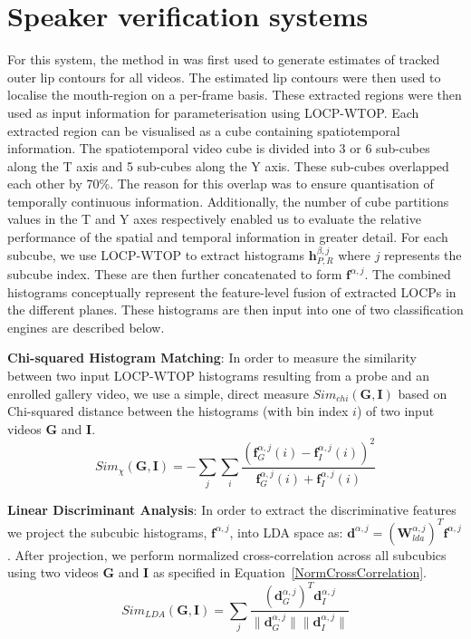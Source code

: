 \documentclass[a4paper, 10pt, conference]{ieeeconf}      %
\begin{document}
\section{Speaker verification systems}
\label{SpeakerVerificationSystems}
For this system, the method in \cite{Ramos00Thesis} was first used to generate estimates of tracked outer lip contours for all videos. 
The estimated lip contours were then used to localise the mouth-region on a per-frame basis. 
These extracted regions were then used as input information for parameterisation using LOCP-WTOP. 
Each extracted region can be visualised as a cube containing spatiotemporal information. 
The spatiotemporal video cube is divided into 3 or 6 sub-cubes along the T axis and 5 sub-cubes along the Y axis. 
These sub-cubes overlapped each other by 70\%. 
The reason for this overlap was to ensure quantisation of temporally continuous information. 
Additionally, the number of cube partitions values in the T and Y axes respectively enabled us to evaluate the relative performance of the spatial and temporal information in greater detail.  
For each subcube, we use LOCP-WTOP to extract histograms $\bm{h}_{P,R}^{\beta,j}$ where $j$ represents the subcube index. 
These are then further concatenated to form $\bm{f}^{\alpha,j}$. 
The combined histograms conceptually represent the feature-level fusion of extracted LOCPs in the different planes. 
These histograms are then input into one of two classification engines are described below. 

\textbf{Chi-squared Histogram Matching}: In order to measure the similarity between two input LOCP-WTOP histograms resulting from a probe and an enrolled gallery video, we use a simple, direct measure $Sim_{chi}(\bm{G},\bm{I})$ based on Chi-squared distance between the histograms (with bin index $i$) of two input videos $\bm{G}$ and $\bm{I}$. 
\begin{equation}
\label{MLBP:Chi_sq}
Sim_{\chi}(\bm{G},\bm{I})=-\sum_j \sum_i \frac{(\bm{f}^{\alpha,j}_{G}(i) -\bm{f}^{\alpha,j}_{I}(i))^2}{\bm{f}^{\alpha,j}_{G}(i)+\bm{f}^{\alpha,j}_{I}(i)}
\end{equation}

\textbf{Linear Discriminant Analysis}: In order to extract the discriminative features we project the subcubic histograms, $\bm{f}^{\alpha,j}$, into LDA space as: $\bm{d}^{\alpha,j}=(\bm{W}^{\alpha,j}_{lda})^{T}\bm{f}^{\alpha,j}$. After projection, we perform normalized cross-correlation across all subcubics using two videos $\bm{G}$ and $\bm{I}$ as specified in Equation~\ref{NormCrossCorrelation}.
\begin{equation}
 Sim_{LDA}(\bm{G},\bm{I}) = \sum_{j}\dfrac{(\bm{d}^{\alpha,j}_{G})^{T}\bm{d}^{\alpha,j}_{I}}{\lVert \bm{d}^{\alpha,j}_{G}\rVert\lVert \bm{d}^{\alpha,j}_{I}\rVert}
\label{NormCrossCorrelation}
\end{equation}
\end{document}
